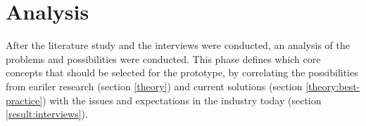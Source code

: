 \section{Analysis}
After the literature study and the interviews were conducted, an analysis of the problems and possibilities were conducted. This phase defines which core concepts that should be selected for the prototype, by correlating the possibilities from eariler research (section \ref{theory}) and current solutions (section \ref{theory:best-practice}) with the issues and expectations in the industry today (section  \ref{result:interviews}).
